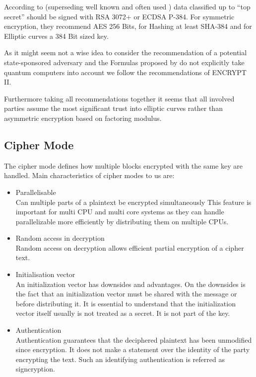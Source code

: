 According to \cite{CNSASuite} (superseding well known and often used \cite{nsa-fact-sheet-B}) data classified up to ``top secret'' should be signed with RSA 3072+ or ECDSA P-384.  For symmetric encryption, they recommend AES 256 Bits, for Hashing at least SHA-384 and for Elliptic curves a 384 Bit sized key.

As it might seem not a wise idea to consider the recommendation of a potential state-sponsored adversary and the Formulas proposed by \citeauthor{Lenstra04keylength.} do not explicitly take quantum computers into account we follow the recommendations of ENCRYPT II.

Furthermore taking all recommendations together it seems that all involved parties assume the most significant trust into elliptic curves rather than asymmetric encryption based on factoring modulus.

\subsection{Cipher Mode}
The cipher mode defines how multiple blocks encrypted with the same key are handled. Main characteristics of cipher modes to us are:
\begin{itemize}
	\item Parallelisable\\ 
	      Can multiple parts of a plaintext be encrypted simultaneously This feature is important for multi CPU and multi core systems as they can handle parallelizable more efficiently by distributing them on multiple CPUs.
	\item Random access in decryption\\
	      Random access on decryption allows efficient partial encryption of a cipher text.
	\item Initialisation vector\\
	      An initialization vector has downsides and advantages. On the downsides is the fact that an initialization vector must be shared with the message or before distributing it. It is essential to understand that the initialization vector itself usually is not treated as a secret. It is not part of the key.
	\item Authentication\\
	      Authentication guarantees that the deciphered plaintext has been unmodified since encryption. It does not make a statement over the identity of the party encrypting the text. Such an identifying authentication is referred as signcryption.
\end{itemize}

